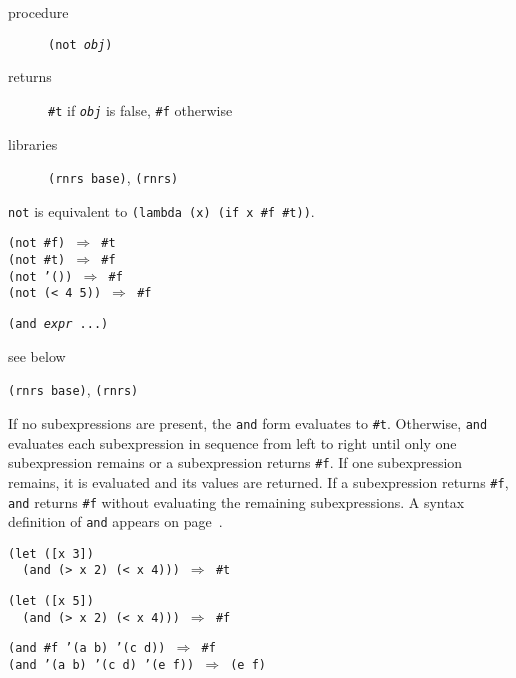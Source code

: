 \begin{description}

\label{control_s10}\item[procedure] \texttt{(not \textit{obj})}



\item[returns] \texttt{\#{}t} if \texttt{\textit{obj}} is false, \texttt{\#{}f} otherwise


\item[libraries] \texttt{(rnrs base)}, \texttt{(rnrs)}
\end{description}

\texttt{not} is equivalent to \texttt{(lambda (x) (if x \#{}f \#{}t))}.

\begin{alltt}
(not \#{}f) \(\Rightarrow\) \#{}t
(not \#{}t) \(\Rightarrow\) \#{}f
(not '()) \(\Rightarrow\) \#{}f
(not (\textless{} 4 5)) \(\Rightarrow\) \#{}f
\end{alltt}

\begin{description}

\label{control_s11}\item[syntax] \texttt{(and \textit{expr} ...)}



\item[returns] see below


\item[libraries] \texttt{(rnrs base)}, \texttt{(rnrs)}
\end{description}


If no subexpressions are present, the \texttt{and} form evaluates to \texttt{\#{}t}.
Otherwise, \texttt{and} evaluates each subexpression in sequence from left to right
until only one subexpression remains or a subexpression returns \texttt{\#{}f}.
If one subexpression remains, it is evaluated and its values are returned.
If a subexpression returns \texttt{\#{}f}, \texttt{and} returns \texttt{\#{}f} without
evaluating the remaining subexpressions.
A syntax definition of \texttt{and} appears on page \pageref{further_defn_and}.


\begin{alltt}
(let ([x 3])
  (and (\textgreater{} x 2) (\textless{} x 4))) \(\Rightarrow\) \#{}t

(let ([x 5])
  (and (\textgreater{} x 2) (\textless{} x 4))) \(\Rightarrow\) \#{}f

(and \#{}f '(a b) '(c d)) \(\Rightarrow\) \#{}f
(and '(a b) '(c d) '(e f)) \(\Rightarrow\) (e f)
\end{alltt}

